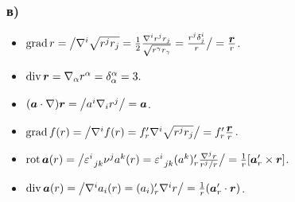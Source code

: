 \subsubsection*{в)}
	\begin{itemize}
	\itemsep0pt
		\item  $\mathop{\mathrm{grad}}\nolimits r = \big/ \nabla^i \sqrt{r^j r_j} = \frac{1}{2}\frac{\nabla^i r^j r_j}{\sqrt{r^\gamma r_\gamma}} = \frac{r^j \delta_{j}^{i}}{r} \big/ = \frac{\mbox{\boldmath $r$}}{r}$.

		\item $\mathop{\mathrm{div}}\nolimits \mbox{\boldmath $r$} = \nabla_\alpha r^\alpha = \delta_\alpha^\alpha = 3. \phantom{\big/} $

		\item $(\mbox{\boldmath $a$} \cdot \nabla) \mbox{\boldmath $r$}= \big/ a^i \nabla_i r^j \big/ = \mbox{\boldmath $a$}$.

		\item $\mathop{\mathrm{grad}}\nolimits f (r) = \big/
		\nabla^i f(r) = f_r' \nabla^i \sqrt{r^j r_j}
		\big/ = f_r' \frac{\mbox{\boldmath $r$}}{r}$.

		\item $\mathop{\mathrm{rot}}\nolimits \mbox{\boldmath $a$}(r) = \big/ \varepsilon_{\phantom{0} j k}^{i} \nu^j a^k(r) = \varepsilon_{\phantom{0} j k}^{i} (a^k)_r' \frac{\nabla^j r}{r^j/r} \big/ = \frac{1}{r} [\mbox{\boldmath $a$}_r' \times \mbox{\boldmath $r$}]$.

		\item $\mathop{\mathrm{div}}\nolimits \mbox{\boldmath $a$}(r) = \big/ \nabla^i a_i(r) = (a_i)_r' \nabla^i r \big/ = \frac{1}{r} (\mbox{\boldmath $a$}_r' \cdot \mbox{\boldmath $r$})$.
	\end{itemize}


